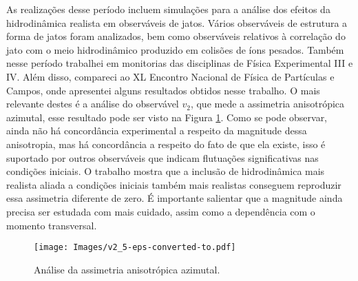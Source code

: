 As realizações desse período incluem simulações para a análise dos efeitos da hidrodinâmica realista em observáveis de jatos. Vários observáveis de estrutura a forma de jatos foram analizados, bem como observáveis relativos à correlação do jato com o meio hidrodinâmico produzido em colisões de íons pesados. Também nesse período trabalhei em monitorias das disciplinas de Física Experimental III e IV. Além disso, compareci ao XL Encontro Nacional de Física de Partículas e Campos, onde apresentei alguns resultados obtidos nesse trabalho. O mais relevante destes é a análise do observável $v_2$, que mede a assimetria anisotrópica azimutal, esse resultado pode ser visto na Figura \ref{v2}. Como se pode observar, ainda não há concordância experimental a respeito da magnitude dessa anisotropia, mas há concordância a respeito do fato de que ela existe, isso é suportado por outros observáveis que indicam flutuações significativas nas condições iniciais. O trabalho mostra que a inclusão de hidrodinâmica mais realista aliada a condições iniciais também mais realistas conseguem reproduzir essa assimetria diferente de zero. É importante salientar que a magnitude ainda precisa ser estudada com mais cuidado, assim como a dependência com o momento transversal.

\begin{figure}
\texttt{[image: Images/v2\_5-eps-converted-to.pdf]}
\caption{Análise da assimetria anisotrópica azimutal.}
\label{v2}
\end{figure}